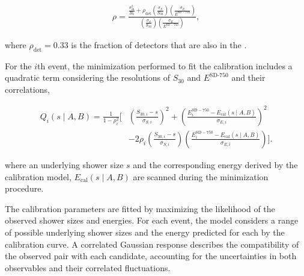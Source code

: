 \documentclass[main.tex]{subfiles}
\begin{document}
{{{\begin{align}
    \rho
    =
    \frac{
        \displaystyle
        \frac{\sigma_{\mathrm{sh}}^2}{B_0}
        +
        \rho_{\mathrm{det}}
        \displaystyle
        \left(
            \frac{\sigma_{S}}{S_{30}}
        \right)
        \left(
            \frac{\sigma_{E}}{E^{\mathrm{SD-750}}}
        \right)
    }{
        \displaystyle
        \left(
            \frac{\sigma_{S}}{S_{30}}
        \right)
        \left(
            \frac{\sigma_{E}}{E^{\mathrm{SD-750}}}
        \right)
    },
\end{align}

where $\rho_{\mathrm{det}}=0.33$ is the fraction of  detectors that are also in the .


For the $i$\-th event, the minimization performed to fit the calibration includes a quadratic term considering the resolutions of $S_{30}$ and $E^{\text{SD-750}}$ and their correlations,  

\begin{align}
    Q_i(s\mid A,B)
    =
    \frac{1}{1-\rho_i^2}
    \Bigg[
        &
        \left(
            \frac{S_{30,i}-s}{\sigma_{S,i}}
        \right)^2
        +
        \left(
            \frac{
                E_i^{\mathrm{SD-750}}
                -
                E_{\mathrm{cal}}(s\mid A,B)
            }{\sigma_{E,i}}
        \right)^2
        \nonumber\\
        &
        -
        2\rho_i
        \left(
            \frac{S_{30,i}-s}{\sigma_{S,i}}
        \right)
        \left(
            \frac{
                E_i^{\mathrm{SD-750}}
                -
                E_{\mathrm{cal}}(s\mid A,B)
            }{\sigma_{E,i}}
        \right)
    \Bigg].
    \label{eq:calibration_mahalanobis}
\end{align}

where an underlying shower size $s$ and the corresponding energy derived by the calibration model, $E_{\mathrm{cal}}(s\mid A,B)$ are scanned during the minimization procedure.  

The calibration parameters are fitted by maximizing the likelihood of the observed shower sizes and  energies. For each event, the model considers a range of possible underlying shower sizes and the energy predicted for each by the calibration curve. A correlated Gaussian response describes the compatibility of the observed pair with each candidate, accounting for the uncertainties in both observables and their correlated fluctuations.

}}}
\end{document}

